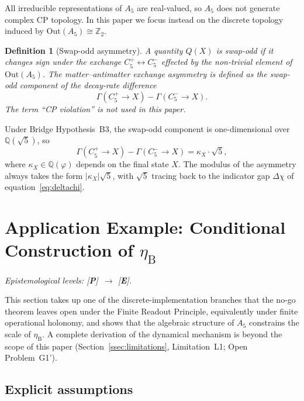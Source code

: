 \documentclass[sn-mathphys-num,Numbered]{sn-jnl}
\theoremstyle{thmstyleone}
\theoremstyle{thmstylethree}
\newtheorem{definition}[theorem]{Definition}
\theoremstyle{thmstyletwo}
\newcommand{\etaB}{\eta_{\mathrm{B}}}
\newcommand{\Qsqrt}{\mathbb{Q}(\sqrt{5})}
\newcommand{\tagP}{[\textbf{P}]}
\newcommand{\tagE}{[\textbf{E}]}
\begin{document}
All irreducible representations of $A_5$ are real-valued, so $A_5$
does not generate complex CP topology.  In this paper we focus instead
on the discrete topology induced by $\mathrm{Out}(A_5) \cong
\mathbb{Z}_2$.

\begin{definition}[Swap-odd asymmetry]
\label{def:swap-odd}
A quantity $Q(X)$ is \emph{swap-odd} if it changes sign under the
exchange $C_5^+ \leftrightarrow C_5^-$ effected by the non-trivial
element of $\mathrm{Out}(A_5)$.  The \emph{matter--antimatter exchange
asymmetry} is defined as the swap-odd component of the decay-rate
difference
\[
  \Gamma(C_5^+ \to X) - \Gamma(C_5^- \to X).
\]
The term ``CP violation'' is not used in this paper.
\end{definition}

Under Bridge Hypothesis~B3, the swap-odd component is one-dimensional
over $\Qsqrt$, so
\begin{equation}
  \Gamma(C_5^+ \to X) - \Gamma(C_5^- \to X) = \kappa_X \cdot \sqrt{5},
  \label{eq:swap-odd}
\end{equation}
where $\kappa_X \in \mathbb{Q}(\varphi)$ depends on the final state
$X$.  The modulus of the asymmetry always takes the form
$|\kappa_X|\sqrt{5}$, with $\sqrt{5}$ tracing back to the indicator gap
$\Delta\chi$ of equation~\eqref{eq:deltachi}.
\section{Application Example: Conditional Construction of
  \texorpdfstring{$\etaB$}{etaB}}
\label{sec:application}

\noindent\textit{Epistemological levels: \tagP\ $\to$ \tagE.}

\medskip\noindent
This section takes up one of the discrete-implementation branches that
the no-go theorem leaves open under the Finite Readout Principle,
equivalently under finite operational holonomy, and shows that the
algebraic structure of $A_5$ constrains the scale of $\etaB$.
A complete derivation of the dynamical mechanism is beyond the scope of
this paper (Section~\ref{ssec:limitations}, Limitation~L1;
Open Problem~G1').

\subsection{Explicit assumptions}
\label{ssec:assumptions}
\end{document}
